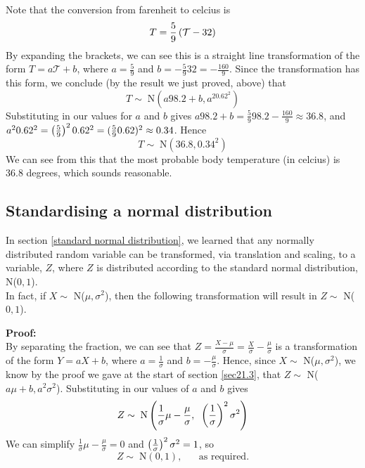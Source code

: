 \noindent Note that the conversion from farenheit to celcius is
\[
T = \frac{5}{9}\left(\mathcal{T} - 32\right)
\]
\solution
By expanding the brackets, we can see this is a straight line transformation of the form $T = a\mathcal{T} + b$, where $a = \frac{5}{9}$ and $b = -\frac{5}{9}32 = -\frac{160}{9}$. Since the transformation has this form, we conclude (by the result we just proved, above) that
\[
T \sim \; \text{N}(a98.2 + b,a^20.62^2)
\]
Substituting in our values for $a$ and $b$ gives $a98.2 + b = \frac{5}{9}98.2 - \frac{160}{9} \approx 36.8$, and  $a^20.62^2 = \left(\frac{5}{9}\right)^20.62^2 = (\frac{5}{9}0.62)^2 \approx 0.34$. Hence
\[
T \sim \; \text{N}(36.8,0.34^2) \tag{approximately}
\]
We can see from this that the most probable body temperature (in celcius) is 36.8 degrees, which sounds reasonable.

\subsection{Standardising a normal distribution} \label{sec21.2}
In section \ref{standard normal distribution}, we learned that any normally distributed random variable can be transformed, via translation and scaling, to a variable, $Z$, where $Z$ is distributed according to the standard normal distribution, N($0,1$). \\

\noindent In fact, if $X \sim$ N($\mu,\sigma^2$), then the following transformation will result in $Z \sim$ N($0,1$).

  	\bigskip
	
	\hfil{}
	\bigskip

\noindent \textbf{Proof:} \\
By separating the fraction, we can see that $Z = \frac{X - \mu}{\sigma} = \frac{X}{\sigma} - \frac{\mu}{\sigma}$ is a transformation of the form $Y = aX + b$, where $a = \frac{1}{\sigma}$ and $b = -\frac{\mu}{\sigma}$. Hence, since $X \sim$ N($\mu,\sigma^2$), we know by the proof we gave at the start of section \ref{sec21.3}, that $Z \sim$ N($a\mu + b,a^2\sigma^2$). Substituting in our values of $a$ and $b$ gives
\[
Z \sim \; \text{N}\left(\frac{1}{\sigma}\mu - \frac{\mu}{\sigma},\;\;\left(\frac{1}{\sigma}\right)^2\sigma^2\right)
\]
We can simplify $\frac{1}{\sigma}\mu - \frac{\mu}{\sigma} = 0$ and $\left(\frac{1}{\sigma}\right)^2\sigma^2 = 1$, so
\[
Z \sim \; \text{N}(0,1), \;\;\;\;\;\; \text{as required.}
\]

